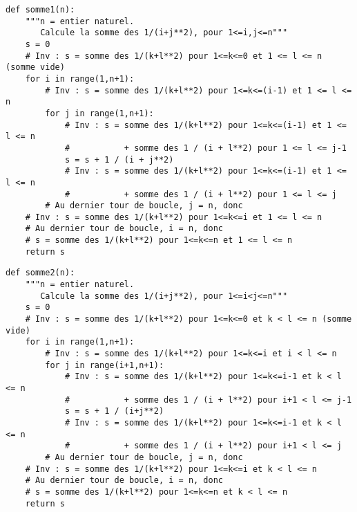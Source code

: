 \exer{}
\setcounter{numques}{0}
\question{}
\begin{lstlisting}
def somme1(n):
    """n = entier naturel.
       Calcule la somme des 1/(i+j**2), pour 1<=i,j<=n"""
    s = 0
    # Inv : s = somme des 1/(k+l**2) pour 1<=k<=0 et 1 <= l <= n (somme vide)
    for i in range(1,n+1):
        # Inv : s = somme des 1/(k+l**2) pour 1<=k<=(i-1) et 1 <= l <= n 
        for j in range(1,n+1):
            # Inv : s = somme des 1/(k+l**2) pour 1<=k<=(i-1) et 1 <= l <= n 
            #           + somme des 1 / (i + l**2) pour 1 <= l <= j-1
            s = s + 1 / (i + j**2)
            # Inv : s = somme des 1/(k+l**2) pour 1<=k<=(i-1) et 1 <= l <= n 
            #           + somme des 1 / (i + l**2) pour 1 <= l <= j
        # Au dernier tour de boucle, j = n, donc 
	# Inv : s = somme des 1/(k+l**2) pour 1<=k<=i et 1 <= l <= n
    # Au dernier tour de boucle, i = n, donc 
    # s = somme des 1/(k+l**2) pour 1<=k<=n et 1 <= l <= n 
    return s
\end{lstlisting}

\begin{lstlisting}
def somme2(n):
    """n = entier naturel.
       Calcule la somme des 1/(i+j**2), pour 1<=i<j<=n"""
    s = 0
    # Inv : s = somme des 1/(k+l**2) pour 1<=k<=0 et k < l <= n (somme vide)
    for i in range(1,n+1):
        # Inv : s = somme des 1/(k+l**2) pour 1<=k<=i et i < l <= n 
        for j in range(i+1,n+1):
            # Inv : s = somme des 1/(k+l**2) pour 1<=k<=i-1 et k < l <= n 
            #           + somme des 1 / (i + l**2) pour i+1 < l <= j-1 
            s = s + 1 / (i+j**2)
            # Inv : s = somme des 1/(k+l**2) pour 1<=k<=i-1 et k < l <= n 
            #           + somme des 1 / (i + l**2) pour i+1 < l <= j 
        # Au dernier tour de boucle, j = n, donc 
	# Inv : s = somme des 1/(k+l**2) pour 1<=k<=i et k < l <= n
    # Au dernier tour de boucle, i = n, donc 
    # s = somme des 1/(k+l**2) pour 1<=k<=n et k < l <= n 
    return s
\end{lstlisting}